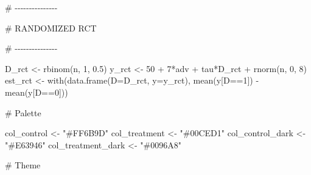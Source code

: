 \documentclass[
  letterpaper,
  DIV=11,
  numbers=noendperiod]{scrreprt}
\newenvironment{Shaded}{\begin{snugshade}}{\end{snugshade}}
\newcommand{\AttributeTok}[1]{\textcolor[rgb]{0.40,0.45,0.13}{#1}}
\newcommand{\CommentTok}[1]{\textcolor[rgb]{0.37,0.37,0.37}{#1}}
\newcommand{\DecValTok}[1]{\textcolor[rgb]{0.68,0.00,0.00}{#1}}
\newcommand{\FloatTok}[1]{\textcolor[rgb]{0.68,0.00,0.00}{#1}}
\newcommand{\FunctionTok}[1]{\textcolor[rgb]{0.28,0.35,0.67}{#1}}
\newcommand{\NormalTok}[1]{\textcolor[rgb]{0.00,0.23,0.31}{#1}}
\newcommand{\OtherTok}[1]{\textcolor[rgb]{0.00,0.23,0.31}{#1}}
\newcommand{\SpecialCharTok}[1]{\textcolor[rgb]{0.37,0.37,0.37}{#1}}
\newcommand{\StringTok}[1]{\textcolor[rgb]{0.13,0.47,0.30}{#1}}
\begin{document}
\begin{Shaded}
\begin{Highlighting}[]
\CommentTok{\# {-}{-}{-}{-}{-}{-}{-}{-}{-}{-}{-}{-}{-}{-}{-}}

\CommentTok{\# RANDOMIZED RCT}

\CommentTok{\# {-}{-}{-}{-}{-}{-}{-}{-}{-}{-}{-}{-}{-}{-}{-}}

\NormalTok{D\_rct }\OtherTok{\textless{}{-}} \FunctionTok{rbinom}\NormalTok{(n, }\DecValTok{1}\NormalTok{, }\FloatTok{0.5}\NormalTok{)}
\NormalTok{y\_rct }\OtherTok{\textless{}{-}} \DecValTok{50} \SpecialCharTok{+} \DecValTok{7}\SpecialCharTok{*}\NormalTok{adv }\SpecialCharTok{+}\NormalTok{ tau}\SpecialCharTok{*}\NormalTok{D\_rct }\SpecialCharTok{+} \FunctionTok{rnorm}\NormalTok{(n, }\DecValTok{0}\NormalTok{, }\DecValTok{8}\NormalTok{)}
\NormalTok{est\_rct }\OtherTok{\textless{}{-}} \FunctionTok{with}\NormalTok{(}\FunctionTok{data.frame}\NormalTok{(}\AttributeTok{D=}\NormalTok{D\_rct, }\AttributeTok{y=}\NormalTok{y\_rct), }\FunctionTok{mean}\NormalTok{(y[D}\SpecialCharTok{==}\DecValTok{1}\NormalTok{]) }\SpecialCharTok{{-}} \FunctionTok{mean}\NormalTok{(y[D}\SpecialCharTok{==}\DecValTok{0}\NormalTok{]))}

\CommentTok{\# Palette}

\NormalTok{col\_control        }\OtherTok{\textless{}{-}} \StringTok{"\#FF6B9D"}
\NormalTok{col\_treatment      }\OtherTok{\textless{}{-}} \StringTok{"\#00CED1"}
\NormalTok{col\_control\_dark   }\OtherTok{\textless{}{-}} \StringTok{"\#E63946"}
\NormalTok{col\_treatment\_dark }\OtherTok{\textless{}{-}} \StringTok{"\#0096A8"}

\CommentTok{\# Theme}


\end{Highlighting}
\end{Shaded}
\end{document}
